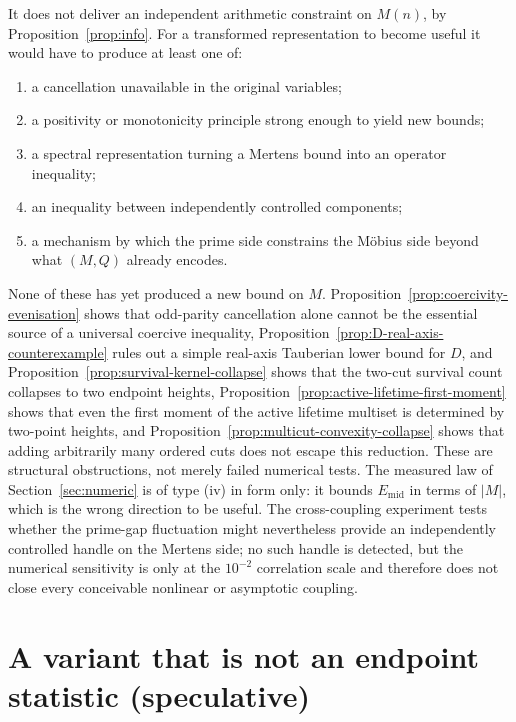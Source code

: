 \documentclass[11pt]{amsart}
\numberwithin{equation}{section}
\theoremstyle{plain}
\theoremstyle{definition}
\theoremstyle{remark}
\newcommand{\Mert}{M}
\newcommand{\Sq}{Q}
\begin{document}
It does not deliver an independent arithmetic constraint on $\Mert(n)$, by
Proposition~\ref{prop:info}. For a transformed representation to become useful
it would have to produce at least one of:
\begin{enumerate}[label=(\roman*)]
\item a cancellation unavailable in the original variables;
\item a positivity or monotonicity principle strong enough to yield new bounds;
\item a spectral representation turning a Mertens bound into an operator inequality;
\item an inequality between independently controlled components;
\item a mechanism by which the prime side constrains the M\"obius side beyond
what $(\Mert,\Sq)$ already encodes.
\end{enumerate}
None of these has yet produced a new bound on $M$.  Proposition~\ref{prop:coercivity-evenisation}
shows that odd-parity cancellation alone cannot be the essential source of a
universal coercive inequality, Proposition~\ref{prop:D-real-axis-counterexample}
rules out a simple real-axis Tauberian lower bound for $D$, and
Proposition~\ref{prop:survival-kernel-collapse} shows that the two-cut survival
count collapses to two endpoint heights,
Proposition~\ref{prop:active-lifetime-first-moment} shows that even the first
moment of the active lifetime multiset is determined by two-point heights, and
Proposition~\ref{prop:multicut-convexity-collapse} shows that adding arbitrarily
many ordered cuts does not escape this reduction.  These are structural
obstructions, not merely failed numerical tests.  The measured law of
Section~\ref{sec:numeric} is of type (iv) in form only: it bounds
$E_{\mathrm{mid}}$ in terms of $|\Mert|$, which is the wrong direction to be
useful. The cross-coupling experiment tests whether the prime-gap fluctuation
might nevertheless provide an independently controlled handle on the Mertens
side; no such handle is detected, but the numerical sensitivity is only at the
$10^{-2}$ correlation scale and therefore does not close every conceivable
nonlinear or asymptotic coupling.

\section{A variant that is not an endpoint statistic (speculative)}
\label{sec:shared-counter}
\end{document}
